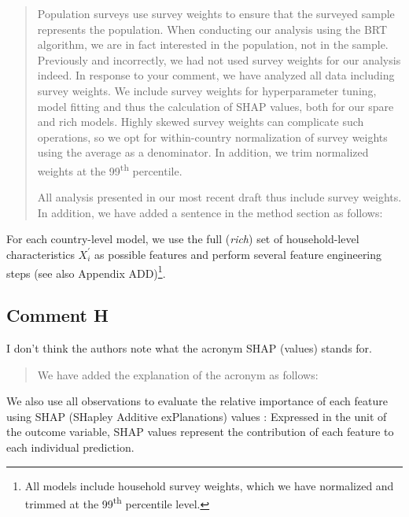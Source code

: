 \documentclass[11pt]{article}
\newenvironment{response}
{\begin{quote}\color{black}}
{\end{quote}}
\begin{document}
\begin{response}

Population surveys use survey weights to ensure that the surveyed sample represents the population. When conducting our analysis using the BRT algorithm, we are in fact interested in the population, not in the sample. Previously and incorrectly, we had not used survey weights for our analysis indeed. In response to your comment, we have analyzed all data including survey weights. We include survey weights for hyperparameter tuning, model fitting and thus the calculation of SHAP values, both for our spare and rich models. Highly skewed survey weights can complicate such operations, so we opt for within-country normalization of survey weights using the average as a denominator. In addition, we trim normalized weights at the 99\textsuperscript{th} percentile.

All analysis presented in our most recent draft thus include survey weights. In addition, we have added a sentence in the method section as follows:

\end{response}

\begin{revisionbox}
    For each country-level model, we use the full (\textit{rich}) set of household-level characteristics $X_{i}^{'}$ as possible features and perform several feature engineering steps (see also Appendix ADD)\footnote{All models include household survey weights, which we have normalized and trimmed at the 99\textsuperscript{th} percentile level.}.
\end{revisionbox}

\subsection*{Comment H}\label{comment_R1_H}

\begin{commentbox}
    I don't think the authors note what the acronym SHAP (values) stands for.
\end{commentbox}

\begin{response}

We have added the explanation of the acronym as follows:

\end{response}

\begin{revisionbox}
    We also use all observations to evaluate the relative importance of each feature using SHAP (SHapley Additive exPlanations) values \autocite{Lundberg.2017}: Expressed in the unit of the outcome variable, SHAP values represent the contribution of each feature to each individual prediction.
\end{revisionbox}
\end{document}
